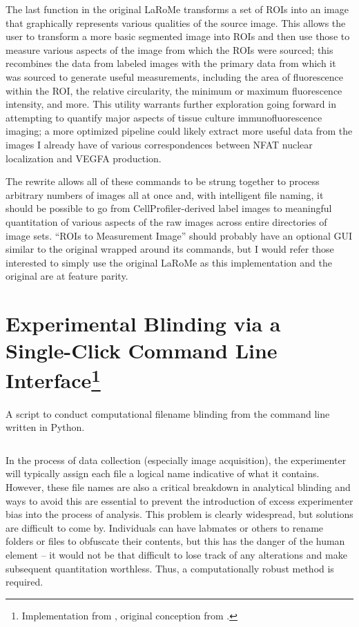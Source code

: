 The last function in the original LaRoMe transforms a set of ROIs into an image that graphically represents various qualities of the source image. This allows the user to transform a more basic segmented image into ROIs and then use those to measure various aspects of the image from which the ROIs were sourced; this recombines the data from labeled images with the primary data from which it was sourced to generate useful measurements, including the area of fluorescence within the ROI, the relative circularity, the minimum or maximum fluorescence intensity, and more. This utility warrants further exploration going forward in attempting to quantify major aspects of tissue culture immunofluorescence imaging; a more optimized pipeline could likely extract more useful data from the images I already have of various correspondences between NFAT nuclear localization and VEGFA production.

The rewrite allows all of these commands to be strung together to process arbitrary numbers of images all at once and, with intelligent file naming, it should be possible to go from CellProfiler\hyp{}derived label images to meaningful quantitation of various aspects of the raw images across entire directories of image sets. ``ROIs to Measurement Image'' should probably have an optional GUI similar to the original wrapped around its commands, but I would refer those interested to simply use the original LaRoMe as this implementation and the original are at feature parity.

\section[Experimental Blinding via a Single\hyp{}Click Command Line Interface]{Experimental Blinding via a Single\hyp{}Click Command Line Interface\footnote{Implementation from \citet{Brewer2022}, original conception from \citet{Salter2016}.}}\label{blinders}

\begin{code}
\caption{A script to conduct computational filename blinding from the command line written in Python.}
\label{blinder}

\inputminted[breaklines,frame=single,fontsize=\small]{python}{source/renamer.py}

\end{code}

In the process of data collection (especially image acquisition), the experimenter will typically assign each file a logical name indicative of what it contains. However, these file names are also a critical breakdown in analytical blinding and ways to avoid this are essential to prevent the introduction of excess experimenter bias into the process of analysis. This problem is clearly widespread, but solutions are difficult to come by. Individuals can have labmates or others to rename folders or files to obfuscate their contents, but this has the danger of the human element -- it would not be that difficult to lose track of any alterations and make subsequent quantitation worthless. Thus, a computationally robust method is required. 

